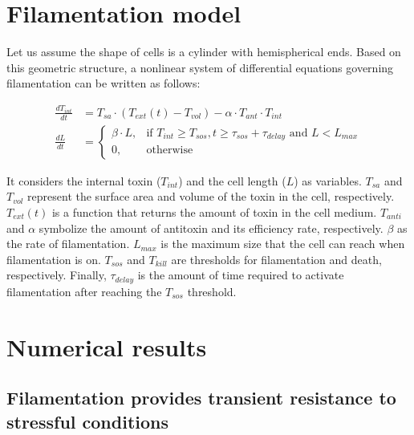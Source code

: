 \documentclass[
  12pt,
  a4paper,
  oneside]{krantz}
\begin{document}
\hypertarget{filamentation-model}{%
\section{Filamentation model}\label{filamentation-model}}

Let us assume the shape of cells is a cylinder with hemispherical ends.
Based on this geometric structure, a nonlinear system of differential
equations governing filamentation can be written as follows:

\begin{equation}
\begin{split}
\frac{dT_{int}}{dt} &= T_{sa} \cdot (T_{ext}(t) - T_{vol}) - \alpha \cdot T_{ant} \cdot T_{int} \\
\frac{dL}{dt} &= 
  \begin{cases} 
    \beta \cdot L,& \text{if } T_{int} \geq T_{sos},  t \geq \tau_{sos} + \tau_{delay} \text{ and } L < L_{max}  \\
    0,            & \text{otherwise}
  \end{cases}
\end{split}
\label{eq:model-equation}
\end{equation}

It considers the internal toxin (\(T_{int}\)) and the cell length (\(L\)) as
variables. \(T_{sa}\) and \(T_{vol}\) represent the surface area and volume
of the toxin in the cell, respectively. \(T_{ext}(t)\) is a function that
returns the amount of toxin in the cell medium. \(T_{anti}\) and \(\alpha\)
symbolize the amount of antitoxin and its efficiency rate, respectively.
\(\beta\) as the rate of filamentation. \(L_{max}\) is the maximum size that
the cell can reach when filamentation is on. \(T_{sos}\) and \(T_{kill}\)
are thresholds for filamentation and death, respectively. Finally,
\(\tau_{delay}\) is the amount of time required to activate filamentation
after reaching the \(T_{sos}\) threshold.

\hypertarget{numerical-results}{%
\section{Numerical results}\label{numerical-results}}

\hypertarget{filamentation-provides-transient-resistance-to-stressful-conditions}{%
\subsection{Filamentation provides transient resistance to stressful conditions}\label{filamentation-provides-transient-resistance-to-stressful-conditions}}
\end{document}
